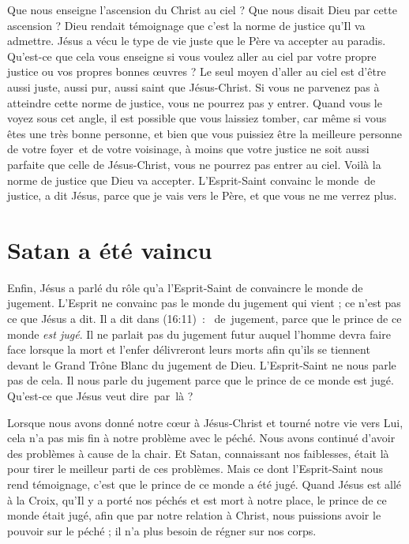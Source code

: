 Que nous enseigne l'ascension du Christ au ciel ?
 Que nous disait Dieu par cette ascension ?
 Dieu rendait témoignage que c'est la norme de justice qu'Il va admettre.
 Jésus a vécu le type de vie juste que le Père va accepter au paradis.
 Qu'est-ce que cela vous enseigne si vous voulez aller au ciel par votre propre
 justice ou vos propres bonnes œuvres ?
 Le seul moyen d'aller au ciel est d'être aussi juste, aussi pur,
 aussi saint que Jésus-Christ.
 Si vous ne parvenez pas à atteindre cette norme de justice,
 vous ne pourrez pas y entrer. Quand vous le voyez sous cet angle,
 il est possible que vous laissiez tomber, car même si vous êtes une très bonne
 personne, et bien que vous puissiez être la meilleure personne de votre foyer~et %
 de votre voisinage, à moins que votre justice ne soit aussi parfaite
 que celle de Jésus-Christ, vous ne pourrez pas entrer au ciel.
 Voilà la norme de justice que Dieu va accepter.
 L'Esprit-Saint convainc le monde~de justice, a dit Jésus,
 \Og parce que je vais vers le Père, et que vous ne me verrez plus. \Fg{}


\section{Satan a \'et\'e vaincu}

Enfin, Jésus a parlé du rôle qu'a l'Esprit-Saint de convaincre le monde de jugement.
 L'Esprit ne convainc pas le monde du jugement qui vient ;
 ce n'est pas ce que Jésus a dit. Il a dit dans (16:11)~:
 \Og [...]~de~jugement, parce que le prince de ce monde \emph{est jugé}. \Fg{}
 Il ne parlait pas du jugement futur auquel l'homme devra faire face
 lorsque la mort et l'enfer délivreront leurs morts afin qu'ils se tiennent
 devant le Grand Trône Blanc du jugement de Dieu.
 L'Esprit-Saint ne nous parle pas de cela. Il nous parle du jugement
 \Og parce que le prince de ce monde est jugé. \Fg{}
 Qu'est-ce que Jésus veut dire~par~là ?

Lorsque nous avons donné notre cœur à Jésus-Christ et tourné notre vie
 vers Lui, cela n'a pas mis fin à notre problème avec le péché.
 Nous avons continué d'avoir des problèmes à cause de la chair.
 Et Satan, connaissant nos faiblesses, était là pour
 tirer le meilleur parti de ces problèmes. Mais ce dont l'Esprit-Saint nous rend témoignage,
 c'est que le prince de ce monde a été jugé.
 Quand Jésus est allé à la Croix, qu'Il y a porté nos péchés et est mort
 à notre place, le prince de ce monde était jugé,
 afin que par notre relation à Christ, nous puissions avoir le pouvoir
 sur le péché ; il n'a plus besoin de régner sur nos corps.

